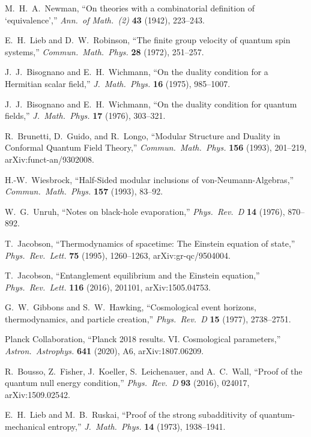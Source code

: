 M.~H.~A.~Newman,
``On theories with a combinatorial definition of `equivalence',''
\emph{Ann.\ of Math.\ (2)} \textbf{43} (1942), 223--243.

E.~H.~Lieb and D.~W.~Robinson,
``The finite group velocity of quantum spin systems,''
\emph{Commun.\ Math.\ Phys.} \textbf{28} (1972), 251--257.

J.~J.~Bisognano and E.~H.~Wichmann,
``On the duality condition for a Hermitian scalar field,''
\emph{J.\ Math.\ Phys.} \textbf{16} (1975), 985--1007.

J.~J.~Bisognano and E.~H.~Wichmann,
``On the duality condition for quantum fields,''
\emph{J.\ Math.\ Phys.} \textbf{17} (1976), 303--321.

R.~Brunetti, D.~Guido, and R.~Longo,
``Modular Structure and Duality in Conformal Quantum Field Theory,''
\emph{Commun.\ Math.\ Phys.} \textbf{156} (1993), 201--219,
arXiv:funct-an/9302008.

H.-W.~Wiesbrock,
``Half-Sided modular inclusions of von-Neumann-Algebras,''
\emph{Commun.\ Math.\ Phys.} \textbf{157} (1993), 83--92.

W.~G.~Unruh,
``Notes on black-hole evaporation,''
\emph{Phys.\ Rev.\ D} \textbf{14} (1976), 870--892.

T.~Jacobson,
``Thermodynamics of spacetime: The Einstein equation of state,''
\emph{Phys.\ Rev.\ Lett.} \textbf{75} (1995), 1260--1263,
arXiv:gr-qc/9504004.

T.~Jacobson,
``Entanglement equilibrium and the Einstein equation,''
\emph{Phys.\ Rev.\ Lett.} \textbf{116} (2016), 201101,
arXiv:1505.04753.

G.~W.~Gibbons and S.~W.~Hawking,
``Cosmological event horizons, thermodynamics, and particle creation,''
\emph{Phys.\ Rev.\ D} \textbf{15} (1977), 2738--2751.

Planck Collaboration,
``Planck 2018 results. VI. Cosmological parameters,''
\emph{Astron.\ Astrophys.} \textbf{641} (2020), A6,
arXiv:1807.06209.

R.~Bousso, Z.~Fisher, J.~Koeller, S.~Leichenauer, and A.~C.~Wall,
``Proof of the quantum null energy condition,''
\emph{Phys.\ Rev.\ D} \textbf{93} (2016), 024017,
arXiv:1509.02542.

E.~H.~Lieb and M.~B.~Ruskai,
``Proof of the strong subadditivity of quantum-mechanical entropy,''
\emph{J.\ Math.\ Phys.} \textbf{14} (1973), 1938--1941.

